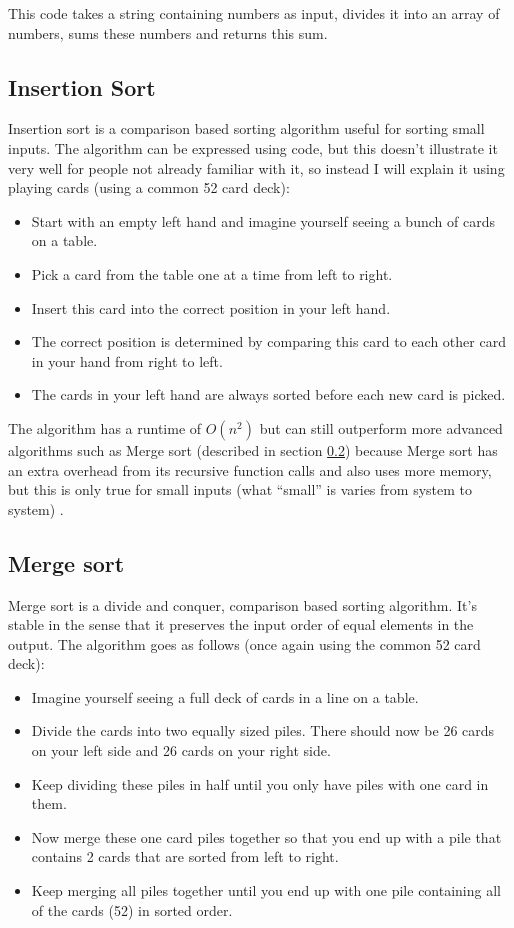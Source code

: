 This code takes a string containing numbers as input, divides it into an array of numbers, sums these numbers and returns this sum.

\subsection{Insertion Sort}
Insertion sort is a comparison based sorting algorithm useful for sorting small inputs. The algorithm can be expressed using code, but this doesn't illustrate it very well for people not already familiar with it, so instead I will explain it using playing cards (using a common 52 card deck):

\begin{itemize}
\item Start with an empty left hand and imagine yourself seeing a bunch of cards on a table.
\item Pick a card from the table one at a time from left to right.
\item Insert this card into the correct position in your left hand.
\item The correct position is determined by comparing this card to each other card in your hand from right to left.
\item The cards in your left hand are always sorted before each new card is picked.
\end{itemize} 

The algorithm has a runtime of $O(n^2)$ but can still outperform more advanced algorithms such as Merge sort (described in section \ref{subsec:merge_sort}) because Merge sort has an extra overhead from its recursive function calls and also uses more memory, but this is only true for small inputs (what ``small'' is varies from system to system) \cite{Insertionsort}.


\subsection{Merge sort} \label{subsec:merge_sort}
Merge sort is a divide and conquer, comparison based sorting algorithm. It's stable in the sense that it preserves the input order of equal elements in the output. The algorithm goes as follows (once again using the common 52 card deck):

\begin{itemize}
\item Imagine yourself seeing a full deck of cards in a line on a table.
\item Divide the cards into two equally sized piles. There should now be 26 cards on your left side and 26 cards on your right side.
\item Keep dividing these piles in half until you only have piles with one card in them. 
\item Now merge these one card piles together so that you end up with a pile that contains 2 cards that are sorted from left to right.
\item Keep merging all piles together until you end up with one pile containing all of the cards (52) in sorted order.

\end{itemize} 

